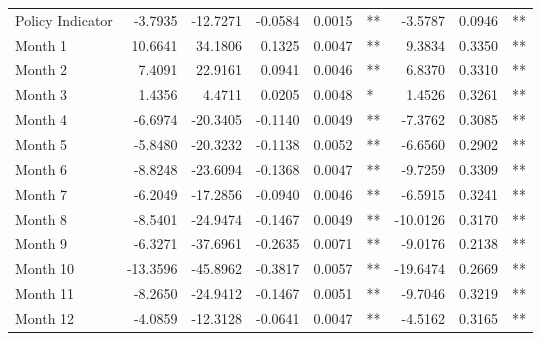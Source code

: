\begin{table}
\begin{tabular}{l r r r r l r r l}
Policy Indicator          &  -3.7935        &  -12.7271       &  -0.0584        &  0.0015       &   **       &  -3.5787        &  0.0946       &   **       \\ 
Month 1                         &  10.6641        &  34.1806       &  0.1325        &  0.0047       &   **       &  9.3834        &  0.3350       &   **       \\ 
Month 2                         &  7.4091        &  22.9161       &  0.0941        &  0.0046       &   **       &  6.8370        &  0.3310       &   **       \\ 
Month 3                         &  1.4356        &  4.4711       &  0.0205        &  0.0048       &    *       &  1.4526        &  0.3261       &   **       \\ 
Month 4                         &  -6.6974        &  -20.3405       &  -0.1140        &  0.0049       &   **       &  -7.3762        &  0.3085       &   **       \\ 
Month 5                         &  -5.8480        &  -20.3232       &  -0.1138        &  0.0052       &   **       &  -6.6560        &  0.2902       &   **       \\ 
Month 6                         &  -8.8248        &  -23.6094       &  -0.1368        &  0.0047       &   **       &  -9.7259        &  0.3309       &   **       \\ 
Month 7                         &  -6.2049        &  -17.2856       &  -0.0940        &  0.0046       &   **       &  -6.5915        &  0.3241       &   **       \\ 
Month 8                         &  -8.5401        &  -24.9474       &  -0.1467        &  0.0049       &   **       &  -10.0126        &  0.3170       &   **       \\ 
Month 9                         &  -6.3271        &  -37.6961       &  -0.2635        &  0.0071       &   **       &  -9.0176        &  0.2138       &   **       \\ 
Month 10                        &  -13.3596        &  -45.8962       &  -0.3817        &  0.0057       &   **       &  -19.6474        &  0.2669       &   **       \\ 
Month 11                        &  -8.2650        &  -24.9412       &  -0.1467        &  0.0051       &   **       &  -9.7046        &  0.3219       &   **       \\ 
Month 12                        &  -4.0859        &  -12.3128       &  -0.0641        &  0.0047       &   **       &  -4.5162        &  0.3165       &   **       \\ 


\end{tabular}
\end{table}
